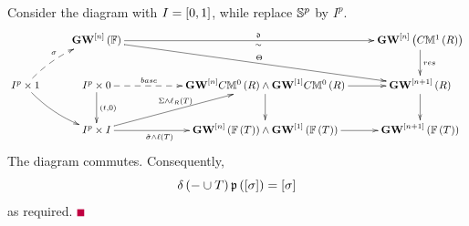 \documentclass[12pt]{article}
\begin{document}
Consider the diagram with $I=\left[ 0, 1\right]$, while replace ${\mathbb{S}}^p$ by $I^p$.
%
$$
\diagram 
&{\bf GW}^{\LRt{n}}\LRf{{\BF}}\ar[rrr]^{\d}_{\sim}\ar[rrrd]^{\Theta}&& &{\bf GW}^{\LRt{n}}\LRf{C{\BM}^{1}\LRf{R}}\ar[d]^{res}\\
I^p\times 1\ar@/^/@{-->}[ru]^{\sigma}\ar@/_/[dr]
&I^p\times 0\ar[d]^{(t, 0)}\ar@{-->}[rr]^{base\qquad \qquad\qquad} 
&& {\bf GW}^{\LRt{n}}C{\BM}^0\LRf{R} \wedge  {\bf GW}^{\LRt{1}}C{\BM}^0\LRf{R}\ar[r] \ar[d]
&{\bf GW}^{\LRt{n+1}}\LRf{R}\ar[d]\\
&I^p\times I\ar[rr]_{\tilde{\sigma}\wedge \ell\LRf{T}\qquad\qquad} \ar[rru]^{\Sigma\wedge \ell_R\LRf{T}}
&&
{\bf GW}^{\LRt{n}}\LRf{{\BF}\LRf{T}} \wedge {\bf GW}^{\LRt{1}}\LRf{{\BF}\LRf{T}} \ar[r]&{\bf GW}^{\LRt{n+1}}\LRf{{\BF}\LRf{T}}\\
\enddiagram
$$
The diagram commutes. 
Consequently,
$$
\delta\left( -\cup T\right)\mathfrak {p}\left( \left[ \sigma\right]\right)=\left[ \sigma\right]
$$
%
as required. \pic $\eop$ 








\end{document}
